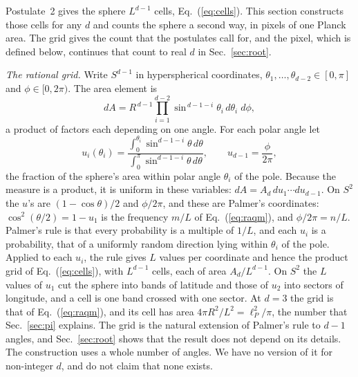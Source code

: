 \documentclass[aps,prd,twocolumn,superscriptaddress,nofootinbib]{revtex4-2}
\begin{document}
Postulate~2 gives the sphere $L^{d-1}$ cells, Eq.~(\ref{eq:cells}). This section constructs those cells for any $d$ and counts the sphere a second way, in pixels of one Planck area. The grid gives the count that the postulates call for, and the pixel, which is defined below, continues that count to real $d$ in Sec.~\ref{sec:root}.

\textit{The rational grid.} Write $S^{d-1}$ in hyperspherical coordinates, $\theta_1,\dots,\theta_{d-2}\in[0,\pi]$ and $\phi\in[0,2\pi)$. The area element is
\begin{equation}
dA = R^{\,d-1}\prod_{i=1}^{d-2}\sin^{\,d-1-i}\theta_i\,d\theta_i\;d\phi,
\label{eq:dA}
\end{equation}
a product of factors each depending on one angle. For each polar angle let
\begin{equation}
u_i(\theta_i) = \frac{\int_0^{\theta_i}\sin^{d-1-i}\theta\,d\theta}{\int_0^{\pi}\sin^{d-1-i}\theta\,d\theta},\qquad u_{d-1} = \frac{\phi}{2\pi},
\label{eq:u}
\end{equation}
the fraction of the sphere's area within polar angle $\theta_i$ of the pole. Because the measure is a product, it is uniform in these variables: $dA = A_d\,du_1\cdots du_{d-1}$. On $S^2$ the $u$'s are $(1-\cos\theta)/2$ and $\phi/2\pi$, and these are Palmer's coordinates: $\cos^2(\theta/2) = 1 - u_1$ is the frequency $m/L$ of Eq.~(\ref{eq:raqm}), and $\phi/2\pi = n/L$. Palmer's rule is that every probability is a multiple of $1/L$, and each $u_i$ is a probability, that of a uniformly random direction lying within $\theta_i$ of the pole. Applied to each $u_i$, the rule gives $L$ values per coordinate and hence the product grid of Eq.~(\ref{eq:cells}), with $L^{d-1}$ cells, each of area $A_d/L^{d-1}$. On $S^2$ the $L$ values of $u_1$ cut the sphere into bands of latitude and those of $u_2$ into sectors of longitude, and a cell is one band crossed with one sector. At $d=3$ the grid is that of Eq.~(\ref{eq:raqm}), and its cell has area $4\pi R^2/L^2 = \ell_P^2/\pi$, the number that Sec.~\ref{sec:pi} explains. The grid is the natural extension of Palmer's rule to $d-1$ angles, and Sec.~\ref{sec:root} shows that the result does not depend on its details. The construction uses a whole number of angles. We have no version of it for non-integer $d$, and do not claim that none exists.
\end{document}
